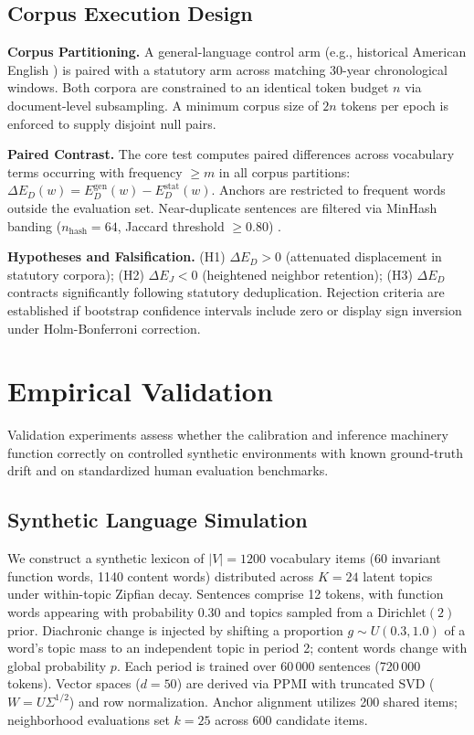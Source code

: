 \documentclass[conference]{IEEEtran}
\begin{document}
\subsection{Corpus Execution Design}
\label{sec:protocol}
\textbf{Corpus Partitioning.} A general-language control arm (e.g., historical American English \cite{davies2012expanding}) is paired with a statutory arm across matching 30-year chronological windows. Both corpora are constrained to an identical token budget $n$ via document-level subsampling. A minimum corpus size of $2n$ tokens per epoch is enforced to supply disjoint null pairs.

\textbf{Paired Contrast.} The core test computes paired differences across vocabulary terms occurring with frequency $\ge m$ in all corpus partitions: $\Delta E_D(w) = E_D^{\text{gen}}(w) - E_D^{\text{stat}}(w)$. Anchors are restricted to frequent words outside the evaluation set. Near-duplicate sentences are filtered via MinHash banding ($n_{\text{hash}}=64$, Jaccard threshold $\ge 0.80$) \cite{broder1997resemblance}.

\textbf{Hypotheses and Falsification.} (H1) $\Delta E_D > 0$ (attenuated displacement in statutory corpora); (H2) $\Delta E_J < 0$ (heightened neighbor retention); (H3) $\Delta E_D$ contracts significantly following statutory deduplication. Rejection criteria are established if bootstrap confidence intervals include zero or display sign inversion under Holm-Bonferroni correction.

\section{Empirical Validation}
\label{sec:validation}
Validation experiments assess whether the calibration and inference machinery function correctly on controlled synthetic environments with known ground-truth drift and on standardized human evaluation benchmarks.

\subsection{Synthetic Language Simulation}
We construct a synthetic lexicon of $|V|=1200$ vocabulary items (60 invariant function words, 1140 content words) distributed across $K=24$ latent topics under within-topic Zipfian decay. Sentences comprise 12 tokens, with function words appearing with probability 0.30 and topics sampled from a $\text{Dirichlet}(2)$ prior. Diachronic change is injected by shifting a proportion $g \sim U(0.3, 1.0)$ of a word's topic mass to an independent topic in period 2; content words change with global probability $p$. Each period is trained over 60\,000 sentences (720\,000 tokens). Vector spaces ($d=50$) are derived via PPMI with truncated SVD ($W=U\Sigma^{1/2}$) and row normalization. Anchor alignment utilizes 200 shared items; neighborhood evaluations set $k=25$ across 600 candidate items.
\end{document}
